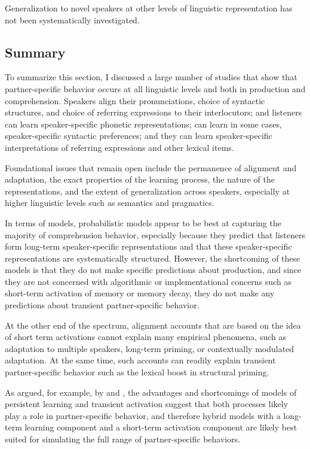 Generalization to novel speakers at other levels of linguistic representation has not been systematically investigated. %

\subsection{Summary}

To summarize this section, I discussed a large number of studies that show that partner-specific behavior occurs at all linguistic levels
and both in production and comprehension. Speakers align their pronunciations, choice of syntactic structures, and choice of referring expressions
to their interlocutors; and listeners can learn speaker-specific phonetic representations; can learn in some cases, speaker-specific syntactic preferences;
and they can learn speaker-specific interpretations of referring expressions and other lexical items.

Foundational issues that remain open include the permanence of alignment and adaptation, the exact properties of the learning process, the nature of the representations, and the extent
of generalization across speakers, especially at higher linguistic levels such as semantics and pragmatics.

In terms of models, probabilistic models appear to be best at capturing the majority of comprehension behavior, especially
because they predict that listeners form long-term speaker-specific representations and that these speaker-specific representations are
systematically structured. However, the shortcoming of these models is that they do not make specific predictions about production, and 
since they are not concerned with algorithmic or implementational concerns \cite{Marr1982} such as short-term activation of memory or 
memory decay, they do not make any predictions about transient partner-specific behavior.

At the other end of the spectrum, alignment accounts that are based on the idea of short term activations cannot explain many 
empirical phenomena, such as adaptation to multiple speakers, long-term priming, or contextually modulated adaptation. At the same time,
such accounts can readily explain transient partner-specific behavior such as the lexical boost in structural priming.

As argued, for example, by \textcite{Ferreira2006} and \textcite{Reitter2011}, the advantages and shortcomings of models of persistent learning
and transient activation suggest that both processes likely play a role in partner-specific behavior, and therefore hybrid models with a long-term learning
component and a short-term activation component are likely best suited for simulating the full range of partner-specific behaviors.

